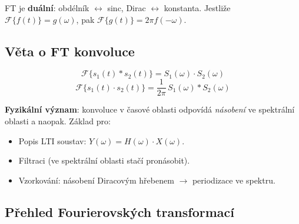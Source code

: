 \documentclass[12pt,a4paper]{article}
\newcommand{\FT}{\mathcal{F}}
\begin{document}
\begin{noteBox}[Dualita FT]
FT je \textbf{duální}: obdélník $\leftrightarrow$ sinc, Dirac $\leftrightarrow$ konstanta. Jestliže $\FT\{f(t)\}=g(\omega)$, pak $\FT\{g(t)\} = 2\pi f(-\omega)$.
\end{noteBox}

\begin{hvezdBox}
\subsection*{Věta o FT konvoluce}
\end{hvezdBox}

\begin{matBox}
\[
  \FT\{s_1(t) * s_2(t)\} = S_1(\omega)\cdot S_2(\omega)
\]
\[
  \FT\{s_1(t)\cdot s_2(t)\} = \frac{1}{2\pi}\,S_1(\omega) * S_2(\omega)
\]
\end{matBox}

\textbf{Fyzikální význam}: konvoluce v časové oblasti odpovídá \emph{násobení} ve spektrální oblasti a naopak. Základ pro:
\begin{itemize}
  \item Popis LTI soustav: $Y(\omega) = H(\omega)\cdot X(\omega)$.
  \item Filtraci (ve spektrální oblasti stačí pronásobit).
  \item Vzorkování: násobení Diracovým hřebenem $\to$ periodizace ve spektru.
\end{itemize}

\begin{hvezdBox}
\subsection*{Přehled Fourierovských transformací}
\end{hvezdBox}
\end{document}

